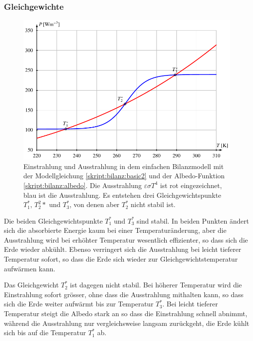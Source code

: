 \subsubsection{Gleichgewichte}
\begin{figure}
\centering
\includegraphics{chapters/5/bilanzmodell.pdf}
\caption{Einstrahlung und Ausstrahlung in dem einfachen Bilanzmodell
mit der Modellgleichung
\eqref{skript:bilanz:basic2} und der Albedo-Funktion
\eqref{skript:bilanz:albedo}.
Die Ausstrahlung $\varepsilon\sigma T^4$ ist rot eingezeichnet,
blau ist die Ausstrahlung.
Es entstehen drei Gleichgewichtspunkte $T_1^*$, $T_2^2*$ und $T_3^*$,
von denen aber $T_2^*$ nicht stabil ist.
\label{skript:bilanz:modellbild}}
\end{figure}
Die beiden Gleichgewichtspunkte $T_1^*$ und $T_3^*$ sind stabil.
In beiden Punkten ändert sich die absorbierte Energie kaum bei
einer Temperaturänderung, aber die Ausstrahlung wird bei erhöhter 
Temperatur wesentlich effizienter, so dass sich die Erde wieder
abkühlt.
Ebenso verringert sich die Ausstrahlung bei leicht tieferer Temperatur
sofort, so dass die Erde sich wieder zur Gleichgewichtstemperatur aufwärmen
kann.

Das Gleichgewicht $T_2^*$ ist dagegen nicht stabil.
Bei höherer Temperatur wird die Einstrahlung sofort grösser, ohne dass
die Ausstrahlung mithalten kann, so dass sich die Erde weiter
aufwärmt bis zur Temperatur $T_3^*$.
Bei leicht tieferer Temperatur steigt die Albedo stark an so dass die
Einstrahlung schnell abnimmt, während die Ausstrahlung nur vergleichsweise
langsam zurückgeht, die Erde kühlt sich bis auf die Temperatur $T_1^*$ ab.

